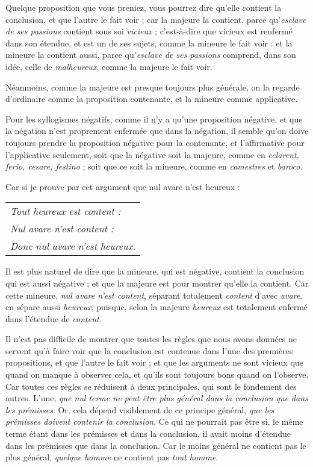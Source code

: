 Quelque proposition que vous preniez, vous pourrez dire qu'elle contient la conclusion, et que l'autre le fait voir ; car la majeure la contient, parce qu'\emph{esclave de ses passions} contient sous soi \emph{vicieux} ; c'est-à-dire que vicieux est renfermé dans son étendue, et est un de ses sujets, comme la mineure le fait voir : et la mineure la contient aussi, parce qu'\emph{esclave de ses passions} comprend, dans son idée, celle de \emph{malheureux}, comme la majeure le fait voir.

Néanmoins, comme la majeure est presque toujours plus générale, on la regarde d'ordinaire comme la proposition contenante, et la mineure comme applicative.

Pour les syllogismes négatifs, comme il n'y a qu'une proposition négative, et que la négation n'est proprement enfermée que dans la négation, il semble qu'on doive toujours prendre la proposition négative pour la contenante, et l'affirmative pour l'applicative seulement, soit que la négative soit la majeure, comme en \emph{celarent, ferio, cesare, festino} ; soit que ce soit la mineure, comme en \emph{camestres} et \emph{baroco}.

Car si je prouve par cet argument que nul avare n'est heureux :

\begin{center}
	\begin{tabular}{l}
		\emph{Tout heureux est content :} \\
		\emph{Nul avare n'est content :} \\
		\emph{Donc nul avare n'est heureux.} \\
	\end{tabular}
\end{center}

Il est plus naturel de dire que la mineure, qui est négative, contient la conclusion qui est aussi négative ; et que la majeure est pour montrer qu'elle la contient. Car cette mineure, \emph{nul avare n'est content}, séparant totalement \emph{content} d'avec \emph{avare}, en sépare aussi \emph{heureux}, puisque, selon la majeure \emph{heureux} est totalement enfermé dans l'étendue de \emph{content}.

Il n'est pas difficile de montrer que toutes les règles que nous avons données ne servent qu'à faire voir que la conclusion est contenue dans l'une des premières propositions, et que l'autre le fait voir ; et que les arguments ne sont vicieux que quand on manque à observer cela, et qu'ils sont toujours bons quand on l'observe. Car toutes ces règles se réduisent à deux principales, qui sont le fondement des autres. L'une, \emph{que nul terme ne peut être plus général dans la conclusion que dans les prémisses}. Or, cela dépend visiblement de ce principe général, \emph{que les prémisses doivent contenir la conclusion}. Ce qui ne pourrait pas être si, le même terme étant dans les prémisses et dans la conclusion, il avait moins d'étendue dans les prémisses que dans la conclusion. Car le moins général ne contient pas le plus général, \emph{quelque homme} ne contient pas \emph{tout homme}.

